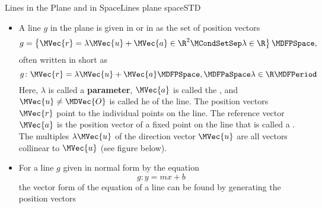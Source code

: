 \begin{MXContent}{Lines in the Plane and in Space}{Lines plane space}{STD}
\begin{MInfo}
\begin{itemize}
 \item A line $g$ in the plane is given in  or in 
   as the set of position vectors
  \[
  g=\left\{\MVec{r}=\lambda\MVec{u}+\MVec{a}\in\R^2\MCondSetSep\lambda\in\R\right\} \MDFPSpace,
  \]
  often written in short as 
  \[
  g\colon \MVec{r}=\lambda\MVec{u}+\MVec{a}\MDFPSpace,\MDFPaSpace\lambda\in\R\MDFPeriod
  \]
  Here, $\lambda$ is called a \textbf{parameter}, $\MVec{a}$ is called
 the , and $\MVec{u}\neq\MDVec{O}$ is called he  
  of the line. The position vectors $\MVec{r}$ point to the individual points on the line. The reference vector 
  $\MVec{a}$ is the position vector of a fixed point on the line that is called a .
  The multiples $\lambda\MVec{u}$ of the direction vector $\MVec{u}$ are all vectors collinear to $\MVec{u}$ (see figure below).
\begin{center}
\end{center}
\item For a line $g$ given in normal form by the equation 
\[
 g\colon y=m x+b
\]
the vector form of the equation of a line can be found by generating the position vectors 

\end{itemize}
\end{MInfo}
\end{MXContent}
